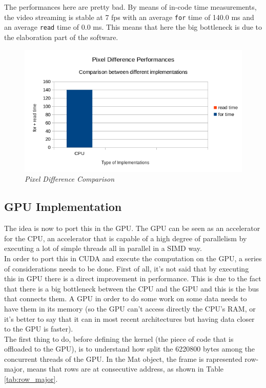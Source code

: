 \documentclass[paper=a4, fontsize=10pt]{scrartcl}	%
\begin{document}
	The performances here are pretty bad. By means of in-code time measurements, the video streaming is stable at 7 fps with an average \texttt{for} time of 140.0 ms and an average \texttt{read} time of 0.0 ms. This means that here the big bottleneck is due to the elaboration part of the software.

	\begin{figure}[H]
		\centering
		\includegraphics[width=0.8\linewidth]{images/chart1.png}
		\caption{\textit{Pixel Difference Comparison}}
	\end{figure}

	\subsection{GPU Implementation}
	\label{sec:gpu-implementation}
	The idea is now to port this in the GPU. The GPU can be seen as an accelerator for the CPU, an accelerator that is capable of a high degree of parallelism by executing a lot of simple threads all in parallel in a SIMD way.\\

	In order to port this in CUDA and execute the computation on the GPU, a series of considerations needs to be done. First of all, it's not said that by executing this in GPU there is a direct improvement in performance. This is due to the fact that there is a big bottleneck between the CPU and the GPU and this is the bus that connects them. A GPU in order to do some work on some data needs to have them in its memory (so the GPU can't access directly the CPU's RAM, or it's better to say that it can in most recent architectures but having data closer to the GPU is faster).\\

	The first thing to do, before defining the kernel (the piece of code that is offloaded to the GPU), is to understand how split the 6220800 bytes among the concurrent threads of the GPU. In the Mat object, the frame is rapresented row-major, means that rows are at consecutive address, as shown in Table \ref{tab:row_major}.
\end{document}
